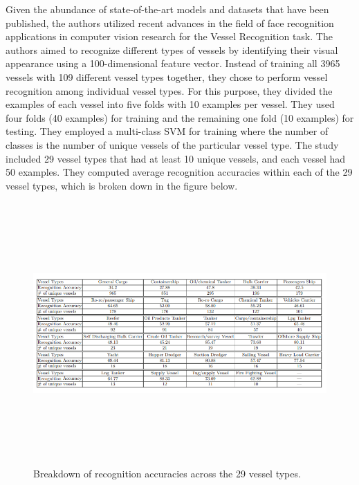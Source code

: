 Given the abundance of state-of-the-art models and datasets that have been published, the authors utilized recent advances in the field of face recognition applications in computer vision research for the Vessel Recognition task. The authors aimed to recognize different types of vessels by identifying their visual appearance using a 100-dimensional feature vector. Instead of training all 3965 vessels with 109 different vessel types together, they chose to perform vessel recognition among individual vessel types. For this purpose, they divided the examples of each vessel into five folds with 10 examples per vessel. They used four folds (40 examples) for training and the remaining one fold (10 examples) for testing. They employed a multi-class SVM for training where the number of classes is the number of unique vessels of the particular vessel type. The study included 29 vessel types that had at least 10 unique vessels, and each vessel had 50 examples. They computed average recognition accuracies within each of the 29 vessel types, which is broken down in the figure below.
\begin{figure}[H]
    \centering
    \includegraphics[width=\textwidth,height=10cm,keepaspectratio=true]{src/Images/marvel_accuracy.PNG}
    \caption{
     Breakdown of recognition accuracies across the 29 vessel types\cite{gundogdu2017marvel}. 
     }
\end{figure}
\\

